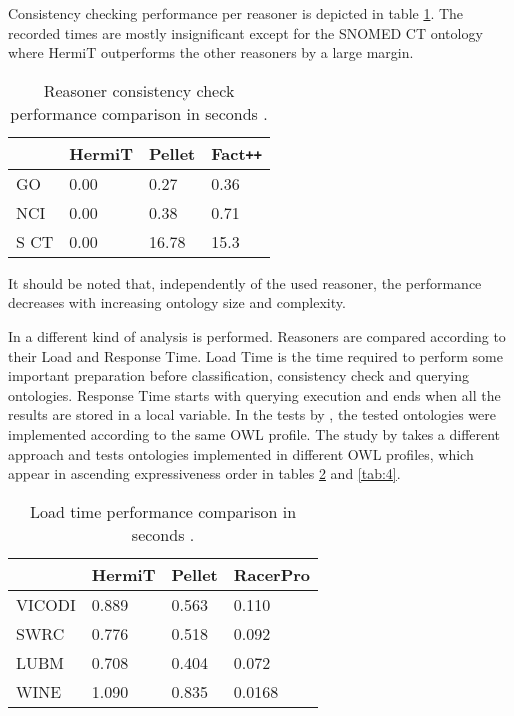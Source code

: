 Consistency checking performance per reasoner is depicted in table \ref{tab:2}. The recorded times are mostly insignificant except for the SNOMED CT ontology where HermiT outperforms the other reasoners by a large margin.

\begin{table}[]
\centering
\caption{Reasoner consistency check performance comparison in seconds \cite{Dentler2011}.}
\begin{tabular}{|l|l|l|l|}
\hline
      &  HermiT  &  Pellet   &  Fact\texttt{++}  \\ \hline
GO    &    0.00  &  0.27     &  0.36   \\ \hline
NCI   &    0.00  &  0.38     &  0.71   \\ \hline
S CT  &    0.00  &  16.78    &  15.3   \\ \hline
\end{tabular}
\label{tab:2}
\end{table}

It should be noted that, independently of the used reasoner, the performance decreases with increasing ontology size and complexity.

In \cite{Bock2008} a different kind of analysis is performed. Reasoners are compared according to their Load and Response Time. Load Time is the time required to perform some important preparation before classification, consistency check and querying ontologies. Response Time starts with querying execution and ends when all the results are stored in a local variable. In the tests by \cite{Dentler2011}, the tested ontologies were implemented according to the same OWL profile. The study by \cite{Bock2008} takes a different approach and tests ontologies implemented in different OWL profiles, which appear in ascending expressiveness order in tables \ref{tab:3} and \ref{tab:4}. 

\begin{table}[]
\centering
\caption{Load time performance comparison in seconds \cite{Bock2008}.}
\begin{tabular}{|l|l|l|l|}
\hline
          &   HermiT  &  Pellet & RacerPro\\ \hline
VICODI    &    0.889  &  0.563  & 0.110   \\ \hline
SWRC      &    0.776  &  0.518  & 0.092   \\ \hline
LUBM      &    0.708  &  0.404  & 0.072   \\ \hline
WINE      &    1.090  &  0.835  & 0.0168  \\ \hline
\end{tabular}
\label{tab:3}
\end{table}

